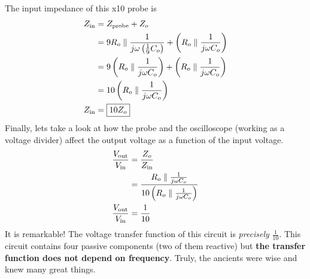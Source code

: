 The input impedance of this x10 probe is
\begin{align*}
    Z_{\text{in}} &= Z_{\text{probe}} + Z_o \\
    &= 9 R_o \parallel \frac{1}{ j\omega \left( \frac{1}{9} C_o \right) } + \left( R_o \parallel \frac{1}{ j\omega C_o } \right) \\
    &= 9 \left( R_o \parallel \frac{1}{ j\omega C_o } \right) + \left( R_o \parallel \frac{1}{ j\omega C_o } \right) \\ 
    &= 10 \left( R_o \parallel \frac{1}{ j\omega C_o } \right) \\
    Z_{\text{in}} &= \boxed{ 10 Z_o }
\end{align*}
Finally, lets take a look at how the probe and the oscilloscope (working as a voltage divider) affect the output voltage as a function of the input voltage.
\begin{align*}
    \frac{V_{\text{out}}}{V_{\text{in}}} &= \frac{Z_o}{Z_{\text{in}}} \\
    &= \frac{ R_o \parallel \frac{1}{ j\omega C_o } }{ 10 \left( R_o \parallel \frac{1}{ j\omega C_o } \right) } \\
    \frac{V_{\text{out}}}{V_{\text{in}}} &= \frac{1}{10}
\end{align*}
It is remarkable! The voltage transfer function of this circuit is \textit{precisely} $\frac{1}{10}$.  This circuit contains four passive components (two of them reactive) but \textbf{the transfer function does not depend on frequency}. Truly, the ancients were wise and knew many great things.


